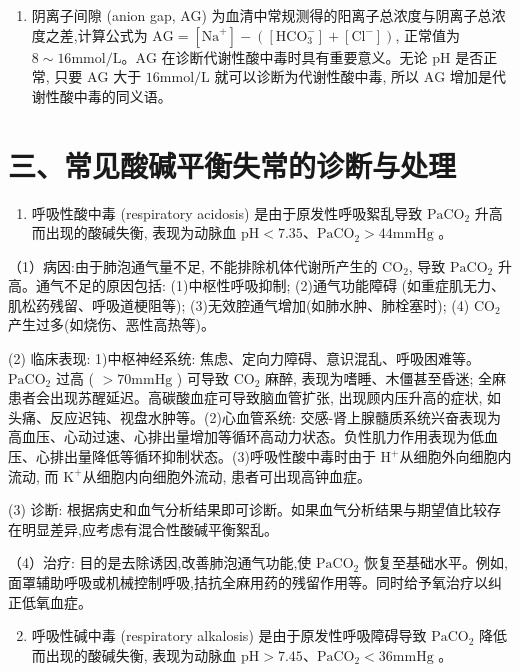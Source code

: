 \documentclass[10pt]{article}
\begin{document}
\begin{enumerate}
  \item 阴离子间隙 (anion gap, AG) 为血清中常规测得的阳离子总浓度与阴离子总浓度之差,计算公式为 $\mathrm{AG}=\left[\mathrm{Na}^{+}\right]-\left(\left[\mathrm{HCO}_{3}^{-}\right]+\left[\mathrm{Cl}^{-}\right]\right)$, 正常值为 $8 \sim 16 \mathrm{mmol} / \mathrm{L} 。 \mathrm{AG}$ 在诊断代谢性酸中毒时具有重要意义。无论 $\mathrm{pH}$ 是否正常, 只要 $\mathrm{AG}$ 大于 $16 \mathrm{mmol} / \mathrm{L}$ 就可以诊断为代谢性酸中毒, 所以 $\mathrm{AG}$ 增加是代谢性酸中毒的同义语。

\end{enumerate}

\section*{三、常见酸碱平衡失常的诊断与处理}
\begin{enumerate}
  \item 呼吸性酸中毒 (respiratory acidosis) 是由于原发性呼吸絮乱导致 $\mathrm{PaCO}_{2}$ 升高而出现的酸碱失衡, 表现为动脉血 $\mathrm{pH}<7.35 、 \mathrm{PaCO}_{2}>44 \mathrm{mmHg}$ 。
\end{enumerate}

（1）病因:由于肺泡通气量不足, 不能排除机体代谢所产生的 $\mathrm{CO}_{2}$, 导致 $\mathrm{PaCO}_{2}$ 升高。通气不足的原因包括: (1)中枢性呼吸抑制; (2)通气功能障碍 (如重症肌无力、肌松药残留、呼吸道梗阻等); (3)无效腔通气增加(如肺水肿、肺栓塞时); (4) $\mathrm{CO}_{2}$ 产生过多(如烧伤、恶性高热等)。

(2) 临床表现: 1)中枢神经系统: 焦虑、定向力障碍、意识混乱、呼吸困难等。 $\mathrm{PaCO}_{2}$ 过高 ( $>70 \mathrm{mmHg}$ ) 可导致 $\mathrm{CO}_{2}$ 麻醉, 表现为嗜睡、木僵甚至昏迷; 全麻患者会出现苏醒延迟。高碳酸血症可导致脑血管扩张, 出现顾内压升高的症状, 如头痛、反应迟钝、视盘水肿等。(2)心血管系统: 交感-肾上腺髓质系统兴奋表现为高血压、心动过速、心排出量增加等循环高动力状态。负性肌力作用表现为低血压、心排出量降低等循环抑制状态。(3)呼吸性酸中毒时由于 $\mathrm{H}^{+}$从细胞外向细胞内流动, 而 $\mathrm{K}^{+}$从细胞内向细胞外流动, 患者可出现高钟血症。

(3) 诊断: 根据病史和血气分析结果即可诊断。如果血气分析结果与期望值比较存在明显差异,应考虑有混合性酸碱平衡絮乱。

（4）治疗: 目的是去除诱因,改善肺泡通气功能,使 $\mathrm{PaCO}_{2}$ 恢复至基础水平。例如,面罩辅助呼吸或机械控制呼吸,拮抗全麻用药的残留作用等。同时给予氧治疗以纠正低氧血症。

\begin{enumerate}
  \setcounter{enumi}{1}
  \item 呼吸性碱中毒 (respiratory alkalosis) 是由于原发性呼吸障碍导致 $\mathrm{PaCO}_{2}$ 降低而出现的酸碱失衡, 表现为动脉血 $\mathrm{pH}>7.45 、 \mathrm{PaCO}_{2}<36 \mathrm{mmHg}$ 。
\end{enumerate}
\end{document}

